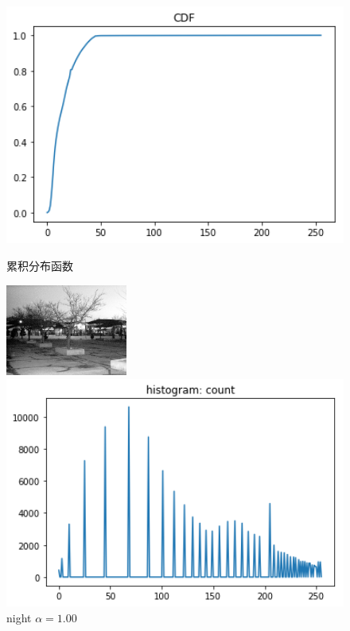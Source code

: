 \documentclass[a4paper,UTF8]{article}
\numberwithin{equation}{section}
\begin{document}
\begin{enumerate}[(\romannumeral1)]
\begin{figure}[!htbp]
\begin{minipage}[t]{0.3\textwidth}
\includegraphics[width=1.0\textwidth]{night_cdf.png}
\caption{累积分布函数}
\label{night:cdf}
\end{minipage}
\centering
\begin{minipage}[t]{0.30\textwidth}
\centering
\includegraphics[width=4cm]{night_processed.png}
\caption{night $\alpha=1.00$}
\label{night:processed}
\end{minipage}
\centering
\begin{minipage}[t]{0.3\textwidth}
\centering
\includegraphics[width=1.0\textwidth]{night_processed_count.png}

\end{minipage}
\end{figure}
\end{enumerate}
\end{document}
